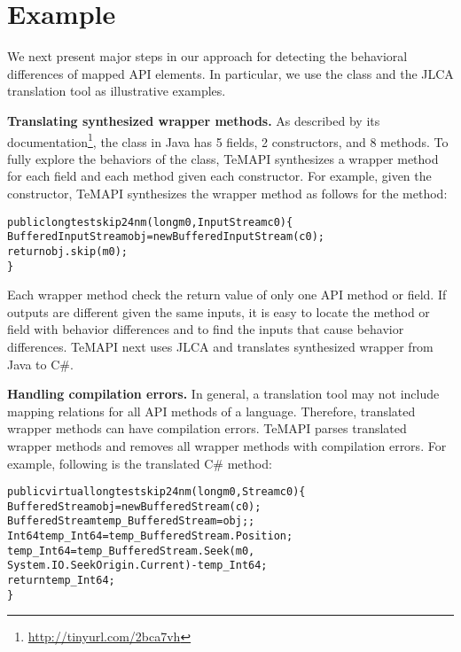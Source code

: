 \section{Example}
\label{sec:example}
We next present major steps in our approach for detecting the behavioral differences of mapped API elements. In particular, we use the  class and the JLCA translation tool as illustrative examples.

\textbf{Translating synthesized wrapper methods.} As described by its documentation\footnote{\url{http://tinyurl.com/2bca7vh}}, the  class in Java has 5 fields, 2 constructors, and 8 methods. To fully explore the behaviors of the class, TeMAPI synthesizes a wrapper method for each field and each method given each constructor. For example, given the  constructor, TeMAPI synthesizes the wrapper method as follows for the  method:

\begin{CodeOut}\vspace*{-1ex}
\begin{alltt}
public long testskip24nm(long m0,InputStream c0)\{
  BufferedInputStream obj = new BufferedInputStream(c0);
  return obj.skip(m0);
\}
\end{alltt}
\end{CodeOut}\vspace*{-2ex}

Each wrapper method check the return value of only one API method or field. If outputs are different given the same inputs, it is easy to locate the method or field with behavior differences and to find the inputs that cause behavior differences. TeMAPI next uses JLCA and translates synthesized wrapper from Java to C\#.

\textbf{Handling compilation errors.} In general, a translation tool may not include mapping relations for all API methods of a language. Therefore, translated wrapper methods can have compilation errors. TeMAPI parses translated wrapper methods and removes all wrapper methods with compilation errors. For example, following is the translated C\#  method:

\begin{CodeOut}\vspace*{-1ex}
\begin{alltt}
public virtual long testskip24nm(long m0, Stream c0)\{
  BufferedStream obj = new BufferedStream(c0);
  BufferedStream temp_BufferedStream = obj;;
  Int64 temp_Int64 = temp_BufferedStream.Position;
  temp_Int64 = temp_BufferedStream.Seek(m0,
        System.IO.SeekOrigin.Current) - temp_Int64;
  return temp_Int64;
\}
\end{alltt}
\end{CodeOut}\vspace*{-2ex}

